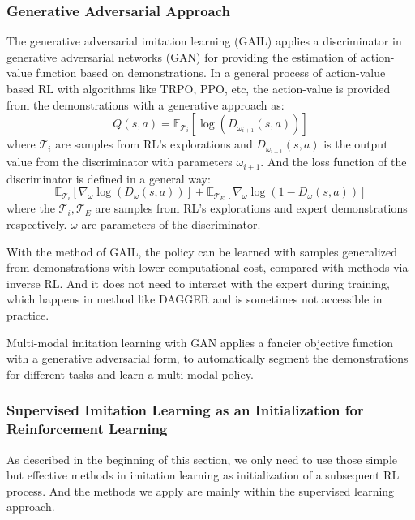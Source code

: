 \documentclass{article}
\begin{document}
\subsubsection{Generative Adversarial Approach}
The generative adversarial imitation learning (GAIL) \cite{ho2016generative} applies a discriminator in generative adversarial networks (GAN) for providing the estimation of action-value function based on demonstrations. In a general process of action-value based RL with algorithms like TRPO, PPO, etc, the action-value is provided from the demonstrations with a generative approach as:
\begin{equation}
    Q(s,a)=\mathbb{E}_{\mathcal{T}_i}[\log(D_{\omega_{i+1}}(s,a))]
\end{equation}
where  $\mathcal{T}_i$ are samples from RL's explorations and $D_{\omega_{i+1}}(s,a)$ is the output value from the discriminator with parameters $\omega_{i+1}$.
And the loss function of the discriminator is defined in a general way:
\begin{equation}
    \mathbb{E}_{\mathcal{T}_i}[\nabla_\omega\log(D_\omega(s,a))]
    +\mathbb{E}_{\mathcal{T}_E}[\nabla_\omega\log(1-D_\omega(s,a))]
\end{equation}
where the $\mathcal{T}_i, \mathcal{T}_E$ are samples from RL's explorations and expert demonstrations respectively. $\omega$ are parameters of the discriminator.

With the method of GAIL, the policy can be learned with samples generalized from demonstrations with lower computational cost, compared with methods via inverse RL. And it does not need to interact with the expert during training, which happens in method like DAGGER and is sometimes not accessible in practice.

Multi-modal imitation learning with GAN \cite{hausman2017multi} applies a fancier objective function with a generative adversarial form, to automatically segment the demonstrations for different tasks and learn a multi-modal policy.

\subsubsection{Supervised Imitation Learning as an Initialization for Reinforcement Learning}
As described in the beginning of this section, we only need to use those simple but effective methods in imitation learning as initialization of a subsequent RL process. And the methods we apply are mainly within the supervised learning approach. 
\end{document}

